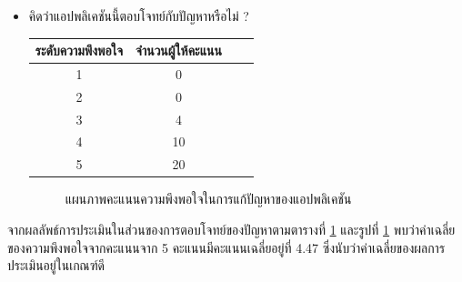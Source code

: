 \documentclass[14pt,oneside,openright,a4paper]{cpe-thai-project}
\begin{document}
\begin{itemize}
  \item คิดว่าแอปพลิเคชันนี้ตอบโจทย์กับปัญหาหรือไม่ ?
  \begin{table}[!h]
    \centering
    \captionsetup{justification=centering} %
    \begin{tabular}{|c|c|c|c|}
      \hline
      \multicolumn{1}{|c|}{\cellcolor[HTML]{9FC5E8}ระดับความพึงพอใจ} &
        \multicolumn{1}{c|}{\cellcolor[HTML]{9FC5E8}จำนวนผู้ให้คะแนน} \\ \hline
       1 & 0
         \\ \hline 
       2 & 0
         \\ \hline 
       3 & 4
         \\ \hline 
       4 & 10
         \\ \hline 
       5 & 20
         \\ \hline
    \end{tabular}
    \label{tab:Problemssolvingsatisfaction}
  \end{table}
  \begin{figure}[!h]\centering
    \setlength{\fboxrule}{0.5mm} %
    \setlength{\fboxsep}{0.5cm}
    \caption{แผนภาพคะแนนความพึงพอใจในการแก้ปัญหาของแอปพลิเคชัน}\label{fig:Problemssolvingsatisfaction}
  \end{figure}
\end{itemize}
จากผลลัพธ์การประเมินในส่วนของการตอบโจทย์ของปัญหาตามตารางที่ \ref{tab:Problemssolvingsatisfaction} และรูปที่ \ref{fig:Problemssolvingsatisfaction} พบว่าค่าเฉลี่ยของความพึงพอใจจากคะแนนจาก 5 คะแนนมีคะแนนเฉลี่ยอยู่ที่ 4.47 ซึ่งนับว่าค่าเฉลี่ยของผลการประเมินอยู่ในเกณฑ์ดี

\newpage
\end{document}
